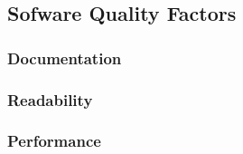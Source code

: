 
\subsection{Sofware Quality Factors}

\subsubsection{Documentation}
\lipsum[2]

\subsubsection{Readability}
\lipsum[4]

\subsubsection{Performance}
\lipsum[5]
